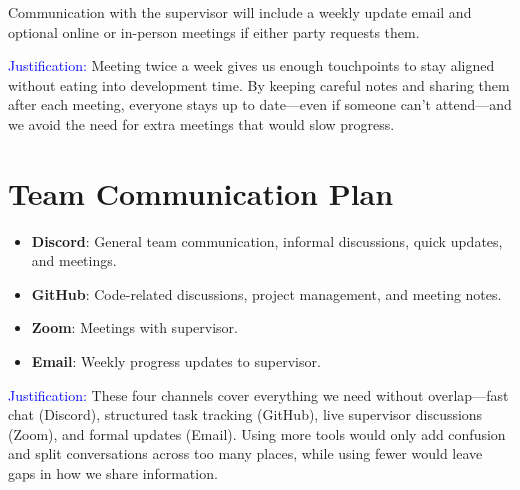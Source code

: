\documentclass{article}
\begin{document}
Communication with the supervisor will include a weekly update email and
optional online or in-person meetings if either party requests them.

\textcolor{blue}{Justification:} Meeting twice a week gives us enough touchpoints
to stay aligned without eating into development time. By keeping careful notes
and sharing them after each meeting, everyone stays up to date—even if someone
can’t attend—and we avoid the need for extra meetings that would slow progress.







\section{Team Communication Plan}

\begin{itemize}
  \item \textbf{Discord}: General team communication, informal discussions, quick updates, and meetings.
  \item \textbf{GitHub}: Code-related discussions, project management, and meeting notes.
  \item \textbf{Zoom}: Meetings with supervisor.
  \item \textbf{Email}: Weekly progress updates to supervisor.

\end{itemize}

\textcolor{blue}{Justification:} These four channels cover everything we need without
overlap—fast chat (Discord), structured task tracking (GitHub), live supervisor
discussions (Zoom), and formal updates (Email). Using more tools would only add
confusion and split conversations across too many places, while using fewer
would leave gaps in how we share information.

\end{document}

